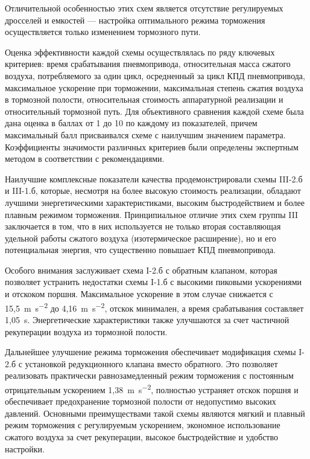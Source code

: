 Отличительной особенностью этих схем является отсутствие регулируемых дросселей и емкостей ---
настройка оптимального режима торможения осуществляется только изменением тормозного пути.

Оценка эффективности каждой схемы осуществлялась по ряду ключевых критериев: время срабатывания пневмопривода,
относительная масса сжатого воздуха, потребляемого за один цикл, осредненный за цикл КПД пневмопривода, максимальное
ускорение при торможении, максимальная степень сжатия воздуха в тормозной полости, относительная стоимость
аппаратурной реализации и относительный тормозной путь. Для объективного сравнения каждой схеме была дана оценка в
баллах от 1 до 10 по каждому из показателей, причем максимальный балл присваивался схеме с наилучшим значением
параметра. Коэффициенты значимости различных критериев были определены экспертным методом в соответствии с
рекомендациями.

Наилучшие комплексные показатели качества продемонстрировали схемы III-2.б и III-1.б, которые, несмотря на
более высокую стоимость реализации, обладают лучшими энергетическими характеристиками, высоким быстродействием
и более плавным режимом торможения. Принципиальное отличие этих схем группы III заключается в том, что в них
используется не только вторая составляющая удельной работы сжатого воздуха (изотермическое расширение), но и его
потенциальная энергия, что существенно повышает КПД пневмопривода.

Особого внимания заслуживает схема I-2.б с обратным клапаном, которая позволяет устранить недостатки схемы I-1.б
с высокими пиковыми ускорениями и отскоком поршня. Максимальное ускорение в этом случае снижается с 15,5~\si{\metre\per\square\second}
до 4,16~\si{\metre\per\square\second}, отскок минимален, а время срабатывания составляет 1,05~\si{\second}. Энергетические характеристики также улучшаются
за счет частичной рекуперации воздуха из тормозной полости.

Дальнейшее улучшение режима торможения обеспечивает модификация схемы I-2.б с установкой редукционного клапана вместо
обратного. Это позволяет реализовать практически равнозамедленный режим торможения с постоянным отрицательным
ускорением 1,38~\si{\metre\per\square\second}, полностью устраняет отскок поршня и обеспечивает предохранение тормозной полости от недопустимо
высоких давлений. Основными преимуществами такой схемы являются мягкий и плавный режим торможения с регулируемым
ускорением, экономное использование сжатого воздуха за счет рекуперации, высокое быстродействие и удобство настройки.

